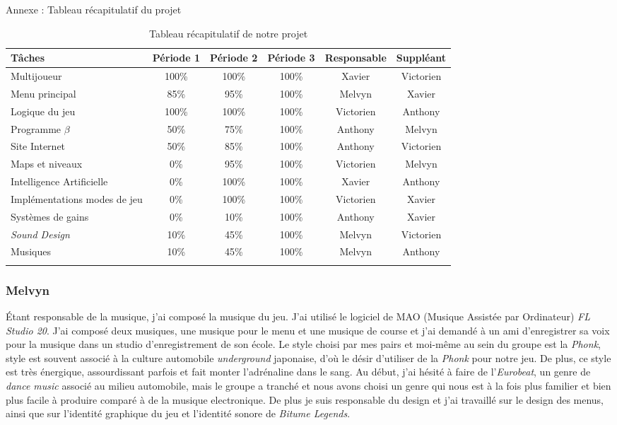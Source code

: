 \documentclass[a4paper,12pt]{article}
\newcommand{\btmlgs}{\textsl{Bitume Legends}}
\newcommand{\AI}{Intelligence Artificielle}
\begin{document}
        \clearpage
        
    {Annexe : Tableau récapitulatif du projet}
    \renewcommand{\arraystretch}{1.2}
    \setlength{\LTleft}{-1cm plus 1 fill}
    \setlength{\LTright}{-1cm plus 1 fill}
    \begin{longtable}{| p{4.5cm} || c | c | c | c | c |}
    \hline
    Tâches & Période 1 & Période 2 & Période 3 & Responsable & Suppléant\\\hline\hline
    Multijoueur & 100\% & 100\% & 100\% & Xavier & Victorien \\\hline
    Menu principal & 85\% & 95\% & 100\% & Melvyn & Xavier \\\hline
    Logique du jeu & 100\% & 100\%  & 100\% & Victorien & Anthony\\\hline
    Programme \(\beta\) & 50\% & 75\% & 100\% & Anthony & Melvyn \\\hline
    Site Internet & 50\% & 85\%  & 100\% & Anthony & Victorien\\\hline
    Maps et niveaux & 0\% & 95\%  & 100\% & Victorien & Melvyn\\\hline
    \AI & 0\% & 100\%  & 100\% & Xavier & Anthony\\\hline
    Implémentations modes de jeu & 0\% & 100\%  & 100\% & Victorien & Xavier\\\hline
    Systèmes de gains & 0\% & 10\%  & 100\% & Anthony & Xavier\\\hline
    \textit{Sound Design} & 10\% & 45\% & 100\% & Melvyn & Victorien\\\hline
    Musiques & 10\% & 45\%  & 100\% & Melvyn & Anthony \\\hline
    \caption{Tableau récapitulatif de notre projet}
\end{longtable}

    \subsubsection{Melvyn}
        Étant responsable de la musique, j'ai composé la 
        musique du jeu. J'ai utilisé le logiciel de MAO (Musique Assistée par Ordinateur) 
        \textsl{FL Studio 20}. J'ai composé deux musiques, une musique pour le menu et 
        une musique de course et j'ai demandé à un ami d'enregistrer sa voix pour la musique
        dans un studio d'enregistrement de son école. Le style choisi par mes pairs et moi-même
        au sein du groupe est la \textsl{Phonk}, style est souvent associé à la culture automobile
        \textit{underground} japonaise, d'où le désir d'utiliser de la \textsl{Phonk} pour notre jeu. 
        De plus, ce style est très énergique, assourdissant parfois et fait monter l'adrénaline
        dans le sang. Au début, j'ai hésité à faire de l'\textit{Eurobeat}, un genre de \textit{dance music}
        associé au milieu automobile, mais le groupe a tranché et nous avons choisi un genre qui
        nous est à la fois plus familier et bien plus facile à produire comparé à de la musique
        electronique. De plus je suis responsable du design et j'ai travaillé sur le design des
        menus, ainsi que sur l'identité graphique du jeu et l'identité sonore de \btmlgs.
\end{document}
